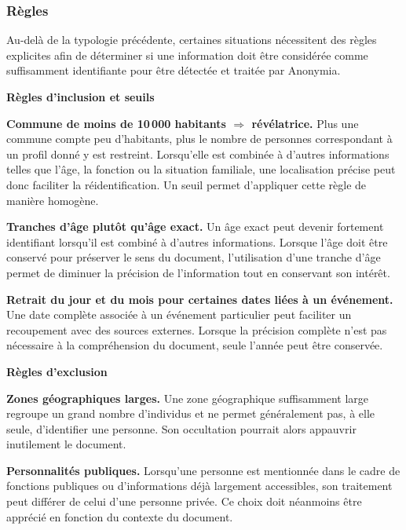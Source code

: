 \documentclass[12pt,a4paper]{article}
\begin{document}
\subsubsection{Règles}

Au-delà de la typologie précédente, certaines situations nécessitent des règles
explicites afin de déterminer si une information doit être considérée comme
suffisamment identifiante pour être détectée et traitée par Anonymia.

\medskip
\noindent\textbf{Règles d'inclusion et seuils}

\smallskip

\textbf{Commune de moins de 10\,000 habitants $\Rightarrow$ révélatrice.}
Plus une commune compte peu d'habitants, plus le nombre de personnes
correspondant à un profil donné y est restreint. Lorsqu'elle est combinée à
d'autres informations telles que l'âge, la fonction ou la situation familiale,
une localisation précise peut donc faciliter la réidentification. Un seuil
permet d'appliquer cette règle de manière homogène.

\medskip

\textbf{Tranches d'âge plutôt qu'âge exact.}
Un âge exact peut devenir fortement identifiant lorsqu'il est combiné à d'autres
informations. Lorsque l'âge doit être conservé pour préserver le sens du
document, l'utilisation d'une tranche d'âge permet de diminuer la précision de
l'information tout en conservant son intérêt.

\medskip

\textbf{Retrait du jour et du mois pour certaines dates liées à un événement.}
Une date complète associée à un événement particulier peut faciliter un
recoupement avec des sources externes. Lorsque la précision complète n'est pas
nécessaire à la compréhension du document, seule l'année peut être conservée.

\medskip
\noindent\textbf{Règles d'exclusion}

\smallskip

\textbf{Zones géographiques larges.}
Une zone géographique suffisamment large regroupe un grand nombre d'individus et
ne permet généralement pas, à elle seule, d'identifier une personne. Son
occultation pourrait alors appauvrir inutilement le document.

\medskip

\textbf{Personnalités publiques.}
Lorsqu'une personne est mentionnée dans le cadre de fonctions publiques ou
d'informations déjà largement accessibles, son traitement peut différer de
celui d'une personne privée. Ce choix doit néanmoins être apprécié en fonction
du contexte du document.
\end{document}
